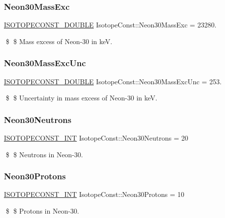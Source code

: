\subsubsection{\texorpdfstring{Neon30\+Mass\+Exc}{Neon30MassExc}}
{\footnotesize\ttfamily \mbox{\hyperlink{group___isotope_const-_macros_ga8f45a7272ce02c0b4c65c44636ed719a}{I\+S\+O\+T\+O\+P\+E\+C\+O\+N\+S\+T\+\_\+\+D\+O\+U\+B\+LE}} Isotope\+Const\+::\+Neon30\+Mass\+Exc = 23280.}

\$ \$ Mass excess of Neon-\/30 in keV. \mbox{\label{group___isotope_const-_neon-_ne30_gaad0c4113c10e20e92585ccbcd0efb92e}} 
\subsubsection{\texorpdfstring{Neon30\+Mass\+Exc\+Unc}{Neon30MassExcUnc}}
{\footnotesize\ttfamily \mbox{\hyperlink{group___isotope_const-_macros_ga8f45a7272ce02c0b4c65c44636ed719a}{I\+S\+O\+T\+O\+P\+E\+C\+O\+N\+S\+T\+\_\+\+D\+O\+U\+B\+LE}} Isotope\+Const\+::\+Neon30\+Mass\+Exc\+Unc = 253.}

\$ \$ Uncertainty in mass excess of Neon-\/30 in keV. \mbox{\label{group___isotope_const-_neon-_ne30_gae893aba3c21b533cc109327e082c8c92}} 
\subsubsection{\texorpdfstring{Neon30\+Neutrons}{Neon30Neutrons}}
{\footnotesize\ttfamily \mbox{\hyperlink{group___isotope_const-_macros_ga5f18360b3e99483a35c32d789e62621c}{I\+S\+O\+T\+O\+P\+E\+C\+O\+N\+S\+T\+\_\+\+I\+NT}} Isotope\+Const\+::\+Neon30\+Neutrons = 20}

\$ \$ Neutrons in Neon-\/30. \mbox{\label{group___isotope_const-_neon-_ne30_ga7c27a5443ce6f3b65a4afd1739e38874}} 
\subsubsection{\texorpdfstring{Neon30\+Protons}{Neon30Protons}}
{\footnotesize\ttfamily \mbox{\hyperlink{group___isotope_const-_macros_ga5f18360b3e99483a35c32d789e62621c}{I\+S\+O\+T\+O\+P\+E\+C\+O\+N\+S\+T\+\_\+\+I\+NT}} Isotope\+Const\+::\+Neon30\+Protons = 10}

\$ \$ Protons in Neon-\/30. 